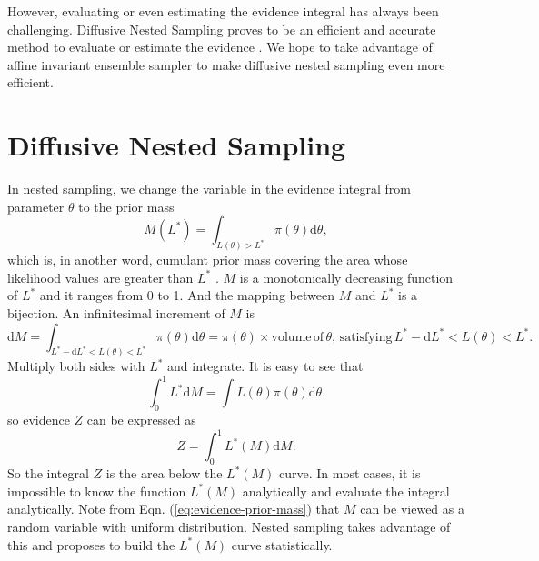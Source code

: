 \documentclass[letterpaper, preprint]{aastex}
\begin{document}
However, evaluating or even estimating the evidence integral has always been challenging. Diffusive Nested Sampling proves to be an efficient and accurate method to evaluate or estimate the evidence \citep{brewer11a}. We hope to take advantage of affine invariant ensemble sampler \citep{goodman10a} to make diffusive nested sampling even more efficient.


\section{Diffusive Nested Sampling}

In nested sampling, we change the variable in the evidence integral from parameter $\theta$ to the prior mass
\begin{equation}
M(L^*)=\int_{L(\theta)>L^*}\!\pi(\theta)\mathrm{d}\theta,
 \label{eq:prior-mass}
\end{equation}
which is, in another word, cumulant prior mass covering the area whose likelihood values are greater than $L^*$ \citep{skilling06a}. $M$ is a monotonically decreasing function of $L^*$ and it ranges from 0 to 1. And the mapping between $M$ and $L^*$ is a bijection. An infinitesimal increment of $M$ is
\begin{equation}
\mathrm{d}M=\int_{L^*-\mathrm{d}L^*<L(\theta)<L^*}\!\pi(\theta)\mathrm{d}\theta = \pi(\theta)\times \mathrm{volume\,of}\,\theta,\,\mathrm{satisfying}\, L^*-\mathrm{d}L^*<L(\theta)<L^*.
\end{equation}
Multiply both sides with $L^*$ and integrate. It is easy to see that
\begin{equation}
\int^1_0\! L^*\mathrm{d}M=\int\!L(\theta)\pi(\theta)\mathrm{d}\theta.
\end{equation}
so evidence $Z$ can be expressed as
\begin{equation}
Z=\int^1_0\! L^*(M)\mathrm{d}M.
 \label{eq:evidence-prior-mass}
\end{equation}
So the integral $Z$ is the area below the $L^*(M)$ curve. In most cases, it is impossible to know the function $L^*(M)$ analytically and evaluate the integral analytically. Note from Eqn. (\ref{eq:evidence-prior-mass}) that $M$ can be viewed as a random variable with uniform distribution. Nested sampling takes advantage of this and proposes to build the $L^*(M)$ curve statistically.
\end{document}

